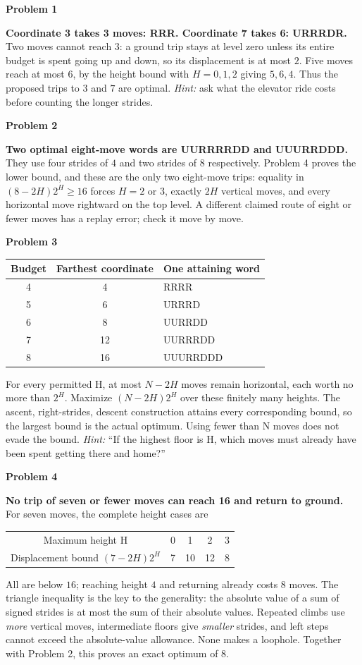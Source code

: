 \documentclass[11pt,letterpaper]{article}
\newcommand{\prob}[1]{\par\vspace{3pt}\textbf{Problem #1}\par}
\begin{document}
\prob{1}
\textbf{Coordinate 3 takes 3 moves: RRR. Coordinate 7 takes 6: URRRDR.}
Two moves cannot reach $3$: a ground trip stays at level zero unless its entire
budget is spent going up and down, so its displacement is at most $2$.
Five moves reach at most $6$, by the height bound with $H=0,1,2$ giving
$5,6,4$. Thus the proposed trips to $3$ and $7$ are optimal.
\textit{Hint:} ask what the elevator ride costs before counting the longer strides.

\prob{2}
\textbf{Two optimal eight-move words are UURRRRDD and UUURRDDD.}
They use four strides of $4$ and two strides of $8$ respectively.
Problem 4 proves the lower bound, and these are the only two eight-move trips:
equality in $(8-2H)2^H\ge16$ forces $H=2$ or $3$, exactly $2H$ vertical moves,
and every horizontal move rightward on the top level. A different claimed route
of eight or fewer moves has a replay error; check it move by move.

\prob{3}
\begin{center}
\begin{tabular}{@{}ccl@{}}\toprule
Budget & Farthest coordinate & One attaining word\\\midrule
4 & 4 & RRRR\\
5 & 6 & URRRD\\
6 & 8 & UURRDD\\
7 & 12 & UURRRDD\\
8 & 16 & UUURRDDD\\\bottomrule
\end{tabular}
\end{center}
For every permitted H, at most $N-2H$ moves remain horizontal, each worth no more
than $2^H$. Maximize $(N-2H)2^H$ over these finitely many heights. The ascent,
right-strides, descent construction attains every corresponding bound, so the
largest bound is the actual optimum. Using fewer than N moves does not evade
the bound. \textit{Hint:} ``If the highest floor is H, which moves must already
have been spent getting there and home?''

\prob{4}
\textbf{No trip of seven or fewer moves can reach 16 and return to ground.}
For seven moves, the complete height cases are
\begin{center}
\begin{tabular}{@{}ccccc@{}}\toprule
Maximum height H & 0 & 1 & 2 & 3\\
Displacement bound $(7-2H)2^H$ & 7 & 10 & 12 & 8\\\bottomrule
\end{tabular}
\end{center}
All are below $16$; reaching height $4$ and returning already costs $8$ moves.
The triangle inequality is the key to the generality: the absolute value of a
sum of signed strides is at most the sum of their absolute values. Repeated
climbs use \emph{more} vertical moves, intermediate floors give \emph{smaller}
strides, and left steps cannot exceed the absolute-value allowance. None makes
a loophole. Together with Problem 2, this proves an exact optimum of $8$.
\end{document}
